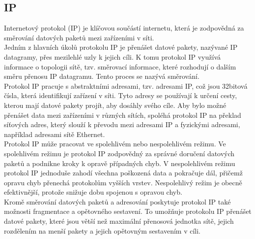 \documentclass[12pt]{report}			%
\begin{document}
\cite{arp1}
\cite{arp2}
\cite{arp3}

				\subsection{IP}
Internetový protokol (IP) je klíčovou součástí internetu, která je zodpovědná za směrování datových paketů mezi zařízeními v síti.
\\
Jedním z hlavních úkolů protokolu IP je přenášet datové pakety, nazývané IP datagramy, přes mezilehlé uzly k jejich cíli. K tomu protokol IP využívá informace o topologii sítě, tzv. směrovací informace, které rozhodují o dalším směru přenosu IP datagramu. Tento proces se nazývá směrování.
\\
Protokol IP pracuje s abstraktními adresami, tzv. adresami IP, což jsou 32bitová čísla, která identifikují zařízení v síti. Tyto adresy se používají k určení cesty, kterou mají datové pakety projít, aby dosáhly svého cíle. Aby bylo možné přenášet data mezi zařízeními v různých sítích, spoléhá protokol IP na překlad síťových adres, který slouží k převodu mezi adresami IP a fyzickými adresami, například adresami sítě Ethernet.
\\
Protokol IP může pracovat ve spolehlivém nebo nespolehlivém režimu. Ve spolehlivém režimu je protokol IP zodpovědný za správné doručení datových paketů a podnikne kroky k opravě případných chyb. V nespolehlivém režimu protokol IP jednoduše zahodí všechna poškozená data a pokračuje dál, přičemž opravu chyb přenechá protokolům vyšších vrstev. Nespolehlivý režim je obecně efektivnější, protože snižuje dobu spojenou s opravou chyb.
\\
Kromě směrování datových paketů a adresování poskytuje protokol IP také možnosti fragmentace a opětovného sestavení. To umožňuje protokolu IP přenášet datové pakety, které jsou větší než maximální přenosová jednotka sítě, jejich rozdělením na menší pakety a jejich opětovným sestavením v cíli.


\cite{IP1}
\cite{IP2}
\cite{IP3}
\cite{IP4}
\end{document}
